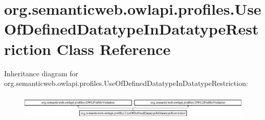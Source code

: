 \hypertarget{classorg_1_1semanticweb_1_1owlapi_1_1profiles_1_1_use_of_defined_datatype_in_datatype_restriction}{\section{org.\-semanticweb.\-owlapi.\-profiles.\-Use\-Of\-Defined\-Datatype\-In\-Datatype\-Restriction Class Reference}
\label{classorg_1_1semanticweb_1_1owlapi_1_1profiles_1_1_use_of_defined_datatype_in_datatype_restriction}
}
Inheritance diagram for org.\-semanticweb.\-owlapi.\-profiles.\-Use\-Of\-Defined\-Datatype\-In\-Datatype\-Restriction\-:\begin{figure}[H]
\begin{center}
\leavevmode
\includegraphics[height=1.236203cm]{classorg_1_1semanticweb_1_1owlapi_1_1profiles_1_1_use_of_defined_datatype_in_datatype_restriction}
\end{center}
\end{figure}
